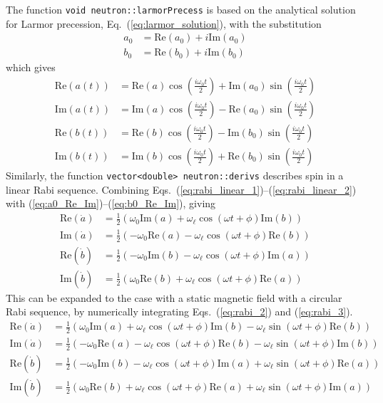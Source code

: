 The function \texttt{void neutron::larmorPrecess} is based on the analytical solution for Larmor precession, Eq.~(\ref{eq:larmor_solution}), with the substitution
%
\begin{align}
    a_0 &= \text{Re}(a_0)+i\text{Im}(a_0)\label{eq:a0_Re_Im}\\
    b_0 &= \text{Re}(b_0)+i\text{Im}(b_0)\label{eq:b0_Re_Im}
\end{align}
%
which gives 
%
\begin{align}
    \text{Re}(a(t)) &= \text{Re}(a)\cos\left(\frac{i\omega_0 t}{2}\right)+\text{Im}(a_0)\sin\left(\frac{i\omega_0 t}{2}\right)\\
    \text{Im}(a(t)) &= \text{Im}(a)\cos\left(\frac{i\omega_0 t}{2}\right)-\text{Re}(a_0)\sin\left(\frac{i\omega_0 t}{2}\right)\\
    \text{Re}(b(t)) &= \text{Re}(b)\cos\left(\frac{i\omega_0 t}{2}\right)-\text{Im}(b_0)\sin\left(\frac{i\omega_0 t}{2}\right)\\
    \text{Im}(b(t)) &= \text{Im}(b)\cos\left(\frac{i\omega_0 t}{2}\right)+\text{Re}(b_0)\sin\left(\frac{i\omega_0 t}{2}\right)
\end{align}
%
Similarly, the function \texttt{vector<double> neutron::derivs} describes spin in a linear Rabi sequence. Combining Eqs.~(\ref{eq:rabi_linear_1})--(\ref{eq:rabi_linear_2}) with (\ref{eq:a0_Re_Im})--(\ref{eq:b0_Re_Im}), giving
%
\begin{align}
    \text{Re}(\dot{a}) &= \frac{1}{2}\left(\omega_0\text{Im}(a) +\omega_\ell\cos(\omega t +\phi)\text{Im}(b) \right) \\
    \text{Im}(\dot{a}) &= \frac{1}{2}\left(-\omega_0\text{Re}(a)-\omega_\ell\cos(\omega t+\phi)\text{Re}(b) \right) \\
    \text{Re}(\dot{b}) &= \frac{1}{2}\left(-\omega_0\text{Im}(b)-\omega_\ell\cos(\omega t+\phi)\text{Im}(a) \right) \\
    \text{Im}(\dot{b}) &= \frac{1}{2}\left(\omega_0\text{Re}(b) +\omega_\ell\cos(\omega t +\phi)\text{Re}(a) \right)
\end{align}
%
This can be expanded to the case with a static magnetic field with a circular Rabi sequence, by numerically integrating  Eqs.~(\ref{eq:rabi_2}) and (\ref{eq:rabi_3}). 
%
\begin{align}
    \text{Re}(\dot{a}) &= \frac{1}{2}\left(\omega_0\text{Im}(a) +\omega_\ell\cos(\omega t +\phi)\text{Im}(b) -\omega_\ell\sin(\omega t +\phi)\text{Re}(b) \right)\\
    \text{Im}(\dot{a}) &= \frac{1}{2}\left(-\omega_0\text{Re}(a)-\omega_\ell\cos(\omega t+\phi)\text{Re}(b) -\omega_\ell\sin(\omega t+\phi)\text{Im}(b) \right) \\
    \text{Re}(\dot{b}) &= \frac{1}{2}\left(-\omega_0\text{Im}(b)-\omega_\ell\cos(\omega t+\phi)\text{Im}(a) +\omega_\ell\sin(\omega t+\phi)\text{Re}(a) \right) \\
    \text{Im}(\dot{b}) &= \frac{1}{2}\left(\omega_0\text{Re}(b) +\omega_\ell\cos(\omega t +\phi)\text{Re}(a) +\omega_\ell\sin(\omega t+\phi)\text{Im}(a) \right)
\end{align}
